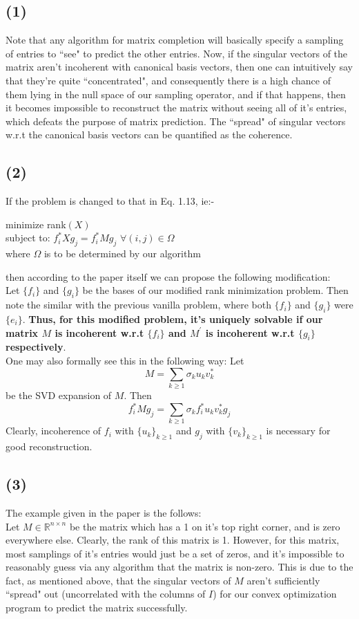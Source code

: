 \documentclass[a4paper,14pt]{article}
\numberwithin{definition}{section}
\numberwithin{mytheorem}{subsection}
\begin{document}
\subsection{(1)}
Note that any algorithm for matrix completion will basically specify a sampling of entries to ``see" to predict the other entries. Now, if the singular vectors of the matrix aren't incoherent with canonical basis vectors, then one can intuitively say that they're quite ``concentrated", and consequently there is a high chance of them lying in the null space of our sampling operator, and if that happens, then it becomes impossible to reconstruct the matrix without seeing all of it's entries, which defeats the purpose of matrix prediction. The ``spread" of singular vectors w.r.t the canonical basis vectors can be quantified as the coherence.
\subsection{(2)}
If the problem is changed to that in Eq. 1.13, ie:-\\
\begin{center}
    minimize rank$(X)$ \\
    subject to: $f^*_iXg_j = f^*_iMg_j$ $\forall (i, j)\in\Omega$\\
    where $\Omega$ is to be determined by our algorithm
\end{center}
then according to the paper itself we can propose the following modification:\\
Let $\{f_i\}$ and $\{g_i\}$ be the bases of our modified rank minimization problem. Then note the similar with the previous vanilla problem, where both $\{f_i\}$ and $\{g_i\}$ were $\{e_i\}$. \textbf{Thus, for this modified problem, it's uniquely solvable if our matrix $M$ is incoherent w.r.t $\{f_i\}$ and $M^\prime$ is incoherent w.r.t $\{g_i\}$ respectively}. \\
One may also formally see this in the following way: Let
$$M = \sum_{k\geq 1} \sigma_ku_kv^*_k$$
be the SVD expansion of $M$.
Then
$$f^*_iMg_j = \sum_{k\geq 1} \sigma_kf^*_iu_kv^*_kg_j$$
Clearly, incoherence of $f_i$ with $\{u_k\}_{k\geq 1}$ and $g_j$ with $\{v_k\}_{k\geq 1}$ is necessary for good reconstruction.
\subsection{(3)}
The example given in the paper is the follows:\\
Let $M\in\mathbb{R}^{n\times n}$ be the matrix which has a 1 on it's top right corner, and is zero everywhere else. Clearly, the rank of this matrix is 1. However, for this matrix, most samplings of it's entries would just be a set of zeros, and it's impossible to reasonably guess via any algorithm that the matrix is non-zero. This is due to the fact, as mentioned above, that the singular vectors of $M$ aren't sufficiently ``spread" out (uncorrelated with the columns of $I$) for our convex optimization program to predict the matrix successfully.
\end{document}
